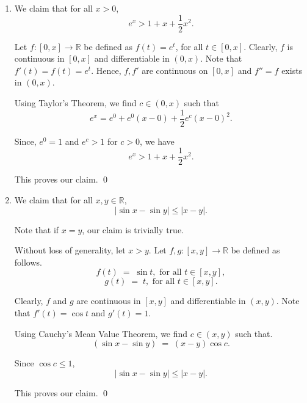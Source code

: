 \documentclass[10pt]{article}
\begin{document}
\begin{enumerate}
                \item We claim that for all $x > 0$,
                \[ e^x > 1 + x + \frac{1}{2}x^2. \]
                
                Let $f\colon [0, x] \to \mathbb{R}$ be defined as $f(t) = e^t$, for all $t \in [0, x]$.
                Clearly, $f$ is continuous in $[0, x]$ and differentiable in $(0, x)$. Note that $f'(t) = f(t) = e^t$.
                Hence, $f, f'$ are continuous on $[0, x]$ and $f'' = f$ exists in $(0, x)$.

                Using Taylor's Theorem, we find $c \in (0, x)$ such that
                \[e^x = e^0 + e^0(x - 0) + \frac{1}{2}e^c(x - 0)^2.\]

                Since, $e^0 = 1$ and $e^c > 1$ for $c > 0$, we have
                \[e^x > 1 + x + \frac{1}{2}x^2.\]

                This proves our claim. \qed


                \item We claim that for all $x, y \in \mathbb{R}$,
                \[
                |\sin{x} - \sin{y}| \le |x - y|.
                \]

                Note that if $x = y$, our claim is trivially true.
                
                Without loss of generality, let $x > y$.
                Let $f, g\colon [x, y] \to \mathbb{R}$ be defined as follows.
                \[ f(t) \;=\; \sin{t}, \text{ for all } t \in [x, y],\]
                \[ g(t) \;=\; t, \text{ for all } t \in [x, y].\]

                Clearly, $f$ and $g$ are continuous in $[x, y]$ and differentiable in $(x, y)$.
                Note that $f'(t) = \cos{t}$ and $g'(t) = 1$.

                Using Cauchy's Mean Value Theorem, we find $c \in (x, y)$ such that.
                \[(\sin{x} - \sin{y}) \;=\; (x - y)\cos{c}.\]

                Since $\cos{c} \le 1$,
                \[|\sin{x} - \sin{y}| \le |x - y|.\]

                This proves our claim. \qed
        \end{enumerate}
\end{document}
